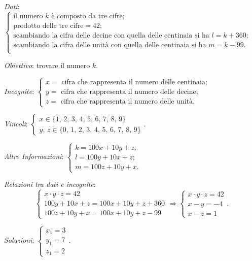 \emph{Dati}: $\left\{\begin{array}{l}
\text{il numero } k \text{ è composto da tre cifre};\\
\text{prodotto delle tre cifre} = 42;\\
\text{scambiando la cifra delle decine con quella delle centinaia si ha }l=k+360; \\
\text{scambiando la cifra delle unità con quella delle centinaia si ha }m=k-99.\\
\end{array}\right.$

\emph{Obiettivo}: trovare il numero $k$.

\emph{Incognite}: $\left\{\begin{array}{l}
x=\text{ cifra che rappresenta il numero delle centinaia;}\\
y=\text{ cifra che rappresenta il numero delle decine;}\\
z=\text{ cifra che rappresenta il numero delle unità.}
\end{array}\right.$

\emph{Vincoli}: $\left\{\begin{array}{l}x\in \{1\text{, }2\text{, }3\text{, }4\text{, }5\text{, }6\text{, }7\text{, }8\text{, }9\} \\y\text{, }z\in \{0\text{, }1\text{, }2\text{, }3\text{, }4\text{, }5\text{, }6\text{, }7\text{, }8\text{, }9\}\end{array}\right.$.

\emph{Altre Informazioni}: $\left\{\begin{array}{l}
k=100x+10y+z;\\
l=100y+10x+z;\\
m=100z+10y+x.
\end{array}\right.$

\emph{Relazioni tra dati e incognite}: \[ \left\{\begin{array}{l}x\cdot y\cdot z=42 \\100y+10x+z=100x+10y+z+360\\100z+10y+x=100x+10y+z-99 \end{array}\right.\Rightarrow \left\{\begin{array}{l}x\cdot y\cdot z=42 \\x-y=-4\\x-z=1\end{array}\right.. \]

\emph{Soluzioni}: $\left\{\begin{array}{l}x_1=3\\y_1=7\\z_1=2\end{array}\right.$.

